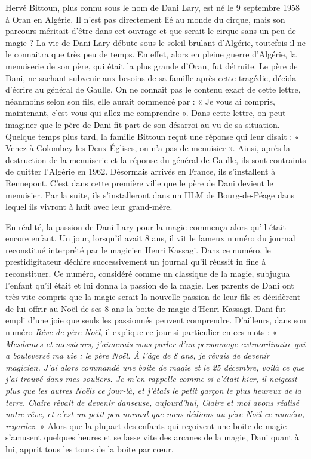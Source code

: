 Hervé Bittoun, plus connu sous le nom de Dani Lary, est né le 9 septembre 1958 à Oran en Algérie. Il n’est pas directement lié au monde du cirque, mais son parcours méritait d’être dans cet ouvrage et que serait le cirque sans un peu de magie ? La vie de Dani Lary débute sous le soleil brulant d’Algérie, toutefois il ne le connaitra que très peu de temps. En effet, alors en pleine guerre d’Algérie, la menuiserie de son père, qui était la plus grande d’Oran, fut détruite. Le père de Dani, ne sachant subvenir aux besoins de sa famille après cette tragédie, décida d'écrire au général de Gaulle. On ne connaît pas le contenu exact de cette lettre, néanmoins selon son fils, elle aurait commencé par : « Je vous ai compris, maintenant, c'est vous qui allez me comprendre ». Dans cette lettre, on peut imaginer que le père de Dani fit part de son désarroi au vu de sa situation. Quelque temps plus tard, la famille Bittoun reçut une réponse qui leur disait : « Venez à Colombey-les-Deux-Églises, on n'a pas de menuisier ». Ainsi, après la destruction de la menuiserie et la réponse du général de Gaulle, ils sont contraints de quitter l’Algérie en 1962. Désormais arrivés en France, ils s’installent à Rennepont. C’est dans cette première ville que le père de Dani devient le menuisier. Par la suite, ils s’installeront dans un HLM de Bourg-de-Péage dans lequel ils vivront à huit avec leur grand-mère.

En réalité, la passion de Dani Lary pour la magie commença alors qu’il était encore enfant. Un jour, lorsqu'il avait 8 ans, il vit le fameux numéro du journal reconstitué interprété par le magicien Henri Kassagi. Dans ce numéro, le prestidigitateur déchire successivement un journal qu’il réussit in fine à reconstituer. Ce numéro, considéré comme un classique de la magie, subjugua l’enfant qu’il était et lui donna la passion de la magie. Les parents de Dani ont très vite compris que la magie serait la nouvelle passion de leur fils et décidèrent de lui offrir au Noël de ses 8 ans la boite de magie d’Henri Kassagi. Dani fut empli d’une joie que seuls les passionnés peuvent comprendre. D’ailleurs, dans son numéro \textit{Rêve de père Noël}, il explique ce jour si particulier en ces mots : «\textit{ Mesdames et messieurs, j’aimerais vous parler d’un personnage extraordinaire qui a bouleversé ma vie : le père Noël. À l’âge de 8 ans, je rêvais de devenir magicien. J'ai alors commandé une boite de magie et le 25 décembre, voilà ce que j’ai trouvé dans mes souliers. Je m’en rappelle comme si c’était hier, il neigeait plus que les autres Noëls ce jour-là, et j’étais le petit garçon le plus heureux de la terre. Claire rêvait de devenir danseuse, aujourd'hui, Claire et moi avons réalisé notre rêve, et c’est un petit peu normal que nous dédions au père Noël ce numéro, regardez. }» Alors que la plupart des enfants qui reçoivent une boite de magie s’amusent quelques heures et se lasse vite des arcanes de la magie, Dani quant à lui, apprit tous les tours de la boite par cœur. 

